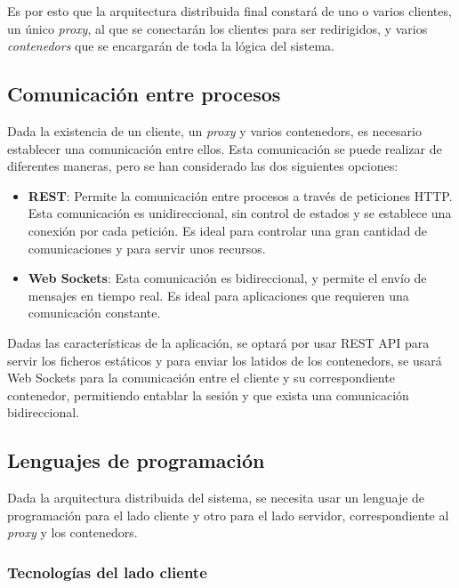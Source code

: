 Es por esto que la arquitectura distribuida final constará de uno o varios clientes, un único \textit{proxy}, al que se conectarán los clientes para ser redirigidos, y varios \textit{\glspl{contenedor}} que se encargarán de toda la lógica del sistema.

\subsection{Comunicación entre procesos} \label{subsec:comunicacion-procesos}

Dada la existencia de un cliente, un \textit{\gls{proxy}} y varios \glspl{contenedor}, es necesario establecer una comunicación entre ellos. Esta comunicación se puede realizar de diferentes maneras, pero se han considerado las dos siguientes opciones: 

\begin{itemize}
    \item \textbf{REST}: Permite la comunicación entre \glspl{proceso} a través de peticiones \gls{HTTP}. Esta comunicación es unidireccional, sin control de estados y se establece una conexión por cada petición. Es ideal para controlar una gran cantidad de comunicaciones y para servir unos recursos.
    \item \textbf{Web Sockets}: Esta comunicación es bidireccional, y permite el envío de mensajes en tiempo real. Es ideal para aplicaciones que requieren una comunicación constante.
\end{itemize}

Dadas las características de la aplicación, se optará por usar \gls{REST API} para servir los ficheros estáticos y para enviar los latidos de los \glspl{contenedor}, se usará Web Sockets para la comunicación entre el cliente y su correspondiente \gls{contenedor}, permitiendo entablar la sesión y que exista una comunicación bidireccional.

\subsection{Lenguajes de programación} \label{subsec:programacion}

Dada la arquitectura distribuida del sistema, se necesita usar un lenguaje de programación para el lado cliente y otro para el lado servidor, correspondiente al \textit{\gls{proxy}} y los \glspl{contenedor}.

\subsubsection{Tecnologías del lado cliente} \label{subsubsec:tecnologias-cliente}

